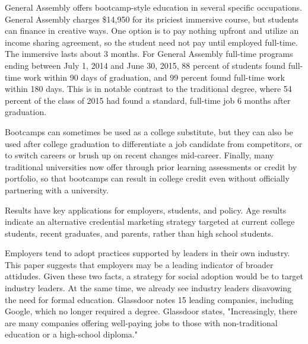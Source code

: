 \documentclass[AER]{./aea-latex-templates/AEA}
\begin{document}
        General Assembly offers bootcamp-style education in several specific occupations. General Assembly
        charges \$14,950 for its priciest immersive course, but students
        can finance in creative ways. One option is to pay nothing upfront and utilize an income sharing
        agreement, so the student need not pay until employed full-time\cite{ga2019}.
        The immersive lasts about 3 months. For General Assembly
        full-time programs ending between July 1, 2014 and June 30, 2015, 88 percent of students found full-time
        work within 90 days of graduation, and 99 percent found full-time work within 180
        days\cite{kirkham_2017}. This is in notable contrast to the traditional degree, where 54 percent of
        the class of 2015 had found a standard, full-time job 6 months after
        graduation\cite{wexler_2016}.
        
        Bootcamps can sometimes be used as a college substitute, but they can also
        be used after college graduation to differentiate a job candidate from
        competitors, or to switch careers or brush up on recent changes
        mid-career. Finally, many traditional universities now offer through prior
        learning assessments or credit by portfolio, so that bootcamps can result
        in college credit even without officially partnering with a university\cite{aceposttraditionallearners}.

        
        Results have key applications for employers, students, and policy.
        Age results indicate an alternative credential marketing strategy targeted at
        current college students, recent graduates, and parents, rather than high school students.
        
        Employers tend to adopt practices supported by leaders in their own industry.
        This paper suggests that employers may be a leading indicator of broader attidudes.
        Given these two facts, a strategy for social adoption would be to target industry leaders.
        At the same time, we already see industry leaders disavowing the need for formal education.
        Glassdoor notes 15 leading companies, including Google, which no longer required a degree\cite{glassdoor_2018}. Glassdoor
        states, "Increasingly, there are many companies offering well-paying jobs
        to those with non-traditional education or a high-school diploma."
        
\end{document}
